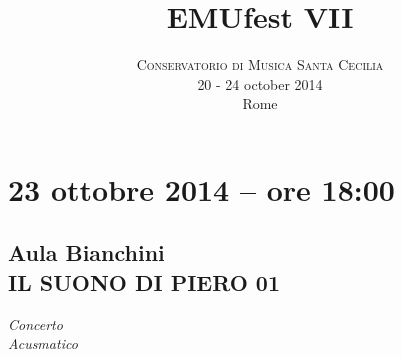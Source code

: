 \documentclass[8pt, twoside, a5paper]{extreport}
\title{\vspace{-15mm}\fontsize{50}{60}\selectfont\textbf{EMUfest VII}} %
\author{
\large
\textsc{Conservatorio di Musica Santa Cecilia}\\[2mm] %
\normalsize 20 - 24 october 2014 \\ %
\normalsize Rome %
\vspace{-5mm}
}
\date{}
\begin{document}
\pagestyle{empty}
\maketitle %


\section*{23 ottobre 2014 -- ore 18:00}
\subsection*{\textsf{Aula Bianchini\\
	{\small IL SUONO DI PIERO 01\\}}}

{\fontsize{40}{40}\selectfont \textit{Concerto\\ Acusmatico}}
\bigskip


\section*{}
	
\end{document}

